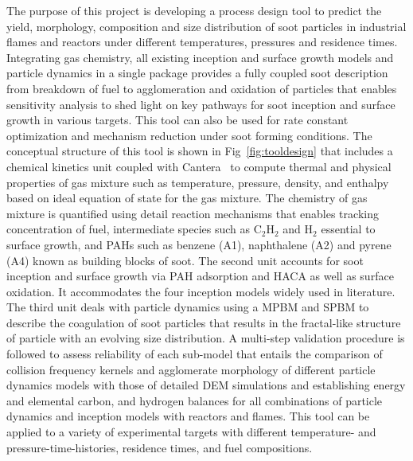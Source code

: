 The purpose of this project is developing a process design tool to predict the yield, morphology, composition and size distribution of soot particles in industrial flames and reactors under different temperatures, pressures and residence times. Integrating gas chemistry, all existing inception and surface growth models and particle dynamics in a single package provides a fully coupled soot description from breakdown of fuel to agglomeration and oxidation of particles that enables sensitivity analysis to shed light on key pathways for soot inception and surface growth in various targets. This tool can also be used for rate constant optimization and mechanism reduction under soot forming conditions. The conceptual structure of this tool is shown in Fig~\ref{fig:tooldesign} that includes a chemical kinetics unit coupled with Cantera~\citep{cantera} to compute thermal and physical properties of gas mixture such as temperature, pressure, density, and enthalpy based on ideal equation of state for the gas mixture. The chemistry of gas mixture is quantified using detail reaction mechanisms that enables tracking concentration of fuel, intermediate species such as $\mathrm{C_2H_2}$ and $\mathrm{H_2}$ essential to surface growth, and PAHs such as benzene (A1), naphthalene (A2) and pyrene (A4) known as building blocks of soot. The second unit accounts for soot inception and surface growth via PAH adsorption and HACA as well as surface oxidation. It accommodates the four inception models widely used in literature. The third unit deals with particle dynamics using a MPBM and SPBM to describe the coagulation of soot particles that results in the fractal-like structure of particle with an evolving size distribution. A multi-step validation procedure is followed to assess reliability of each sub-model that entails the comparison of collision frequency kernels and agglomerate morphology of different particle dynamics models with those of detailed DEM simulations and establishing energy and elemental carbon, and hydrogen balances for all combinations of particle dynamics and inception models with reactors and flames. This tool can be applied to a variety of experimental targets with different temperature- and pressure-time-histories, residence times, and fuel compositions.

